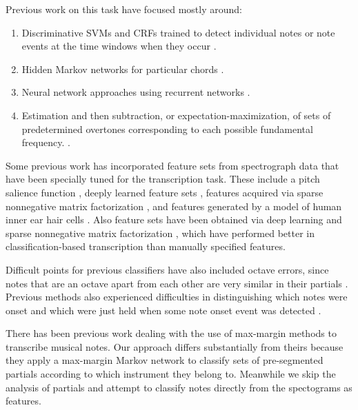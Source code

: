 \documentclass{article}
\begin{document}
\pagebreak %
Previous work on this task have focused mostly around:
\begin{enumerate}
\item Discriminative SVMs and CRFs trained to detect individual notes
  or note events at the time windows when they occur
  \cite{ryynanen2005polyphonic} \cite{poliner2006discriminative}
  \cite{gang2009polyphonic}.
\item Hidden Markov networks for particular chords \cite{raphael2002automatic}.
\item Neural network approaches using recurrent networks
  \cite{marolt2004connectionist} \cite{bock2012polyphonic}.
\item Estimation and then subtraction, or expectation-maximization, of sets of
  predetermined overtones corresponding to each possible fundamental frequency.
  \cite{5946322}.
\end{enumerate}

  Some previous work has incorporated feature sets from spectrograph
  data that have been specially tuned for the transcription task.
  These include a pitch salience function \cite{5946322}, deeply learned
  feature sets \cite{nam2011classification}, features acquired via sparse
  nonnegative matrix factorization \cite{costantini2013nmf}, and features
  generated by a model of human inner ear hair cells
  \cite{marolt2004connectionist}. Also feature sets have
been obtained via deep learning \cite{nam2011classification} and sparse
nonnegative matrix factorization \cite{costantini2013nmf}, which have performed
better in classification-based transcription than manually specified features.

Difficult points for previous classifiers have also included octave errors,
since notes that are an octave apart from each other are very similar in
their partials \cite{bock2012polyphonic} \cite{poliner2006discriminative}.
Previous methods also experienced
difficulties in distinguishing which notes were onset and which were just held
when some note onset event was detected \cite{marolt2004connectionist}.

There has been previous work \cite{gang2009polyphonic} dealing with the use
of max-margin methods to transcribe musical notes. Our approach differs
substantially from theirs because they apply a max-margin Markov network to
classify sets of pre-segmented partials according to which instrument they
belong to. Meanwhile we skip the analysis of partials and attempt to classify
notes directly from the spectograms as features. 
\end{document}
